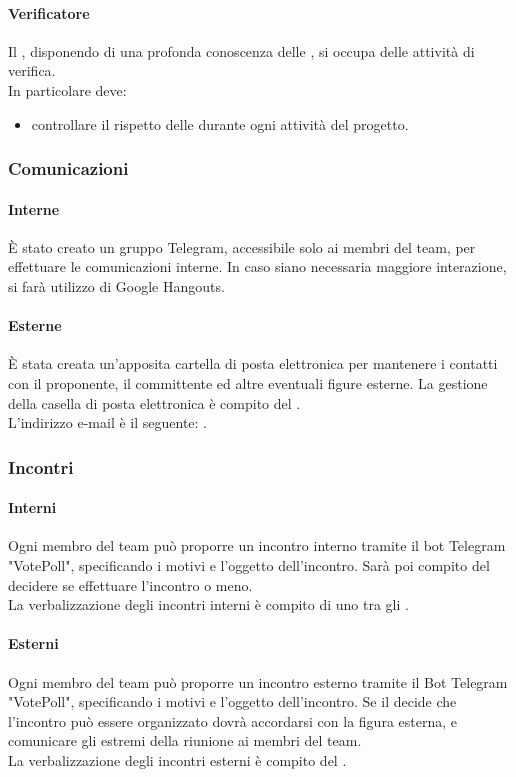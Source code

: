  \paragraph{Verificatore}
 Il \VER , disponendo di una profonda conoscenza delle \NPdoc , si occupa delle attività di verifica. \\
 In particolare deve: 
 \begin{itemize}
  \item controllare il rispetto delle \NPdoc durante ogni attività del progetto.
 \end{itemize} 
\subsubsection{Comunicazioni}
 \paragraph{Interne}
 È stato creato un gruppo Telegram, accessibile solo ai membri del team, per effettuare le comunicazioni interne. In caso siano necessaria maggiore interazione, si farà utilizzo di Google Hangouts. 
 \paragraph{Esterne}
 È stata creata un'apposita cartella di posta elettronica per mantenere i contatti con il proponente, il committente ed altre eventuali figure esterne.
 La gestione della casella di posta elettronica è compito del \RESP. \\
 L'indirizzo e-mail è il seguente: \EMAIL.
\subsubsection{Incontri}
 \paragraph{Interni}
 Ogni membro del team può proporre un incontro interno tramite il bot Telegram "VotePoll", specificando i motivi e l'oggetto dell'incontro. 
 Sarà poi compito del \RESP{} decidere se effettuare l'incontro o meno.\\
  La verbalizzazione degli incontri interni è compito di uno tra gli \AMMP.
 \paragraph{Esterni} 
 Ogni membro del team può proporre un incontro esterno tramite il Bot Telegram "VotePoll", specificando i motivi e l'oggetto dell'incontro. 
Se il \RESP{} decide che l'incontro può essere organizzato dovrà accordarsi con la figura esterna, e comunicare gli estremi della riunione ai membri del team.\\
 La verbalizzazione degli incontri esterni è compito del \RESP.
